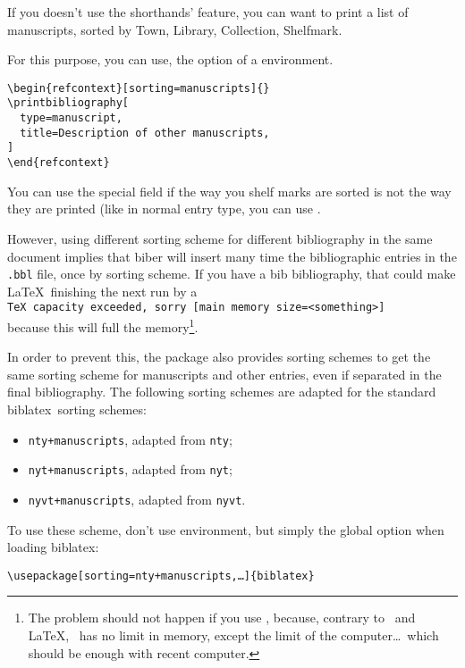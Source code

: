 \documentclass{ltxdockit}[2011/03/25]
\newcommand{\biblatex}{biblatex\xspace}
\begin{document}
\label{sorting} If you doesn't use the shorthands' feature, you can want to print a list of manuscripts, sorted by Town, Library, Collection, Shelfmark.

For this purpose, you can use, the option  of a  environment. 

\begin{verbatim}
\begin{refcontext}[sorting=manuscripts]{}
\printbibliography[
  type=manuscript,
  title=Description of other manuscripts,
]
\end{refcontext}
\end{verbatim}

You can use the special field  if the way you shelf marks are sorted is not the way they are printed (like in normal entry type, you can use .

However, using different sorting scheme for different bibliography in the same document implies that biber will insert many time the bibliographic entries in the \verb+.bbl+ file, once by sorting scheme.
If you have a bib bibliography, that could make \LaTeX\ finishing the next run by a\\ \verb`TeX capacity exceeded, sorry [main memory size=<something>]`
\\
because this will full the memory\footnote{The problem should not happen if you use \LuaLaTeX, because, contrary to \XeLaTeX\ and \LaTeX, \LuaLaTeX\ has no limit in memory, except the limit of the computer\ldots\ which should be enough with recent computer.}.

In order to prevent this, the package also provides sorting schemes to get the same sorting scheme for manuscripts and other entries, even if separated in the final bibliography.
The following sorting schemes are adapted for the standard \biblatex\ sorting schemes:
\begin{itemize}
  \item \verb`nty+manuscripts`, adapted from \verb+nty+; 
  \item \verb-nyt+manuscripts-, adapted from \verb-nyt-;
  \item \verb-nyvt+manuscripts-, adapted from \verb-nyvt-.
\end{itemize}

To use these scheme, don't use  environment, but simply the global option when loading \biblatex:
\begin{verbatim}
\usepackage[sorting=nty+manuscripts,…]{biblatex}
\end{verbatim}
\end{document}
